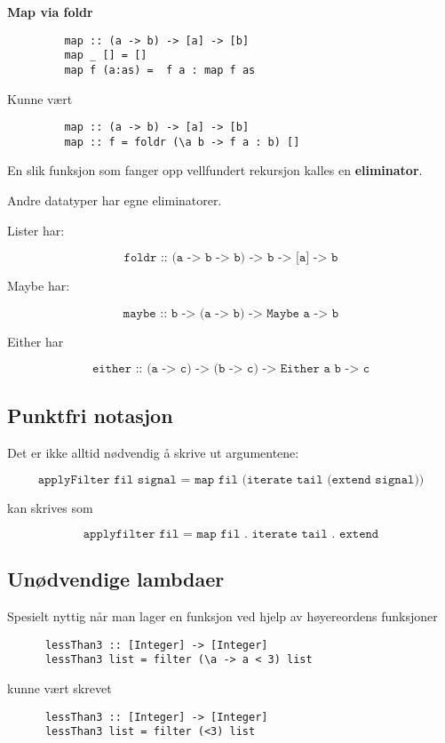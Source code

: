 \documentclass{article}
\begin{document}
     \begin{eg}
         \textbf{Map via foldr}
         \begin{lstlisting}
         map :: (a -> b) -> [a] -> [b] 
         map _ [] = []
         map f (a:as) =  f a : map f as
         \end{lstlisting}

         Kunne vært

         \begin{lstlisting}
         map :: (a -> b) -> [a] -> [b] 
         map :: f = foldr (\a b -> f a : b) []
         \end{lstlisting}
     \end{eg}

     En slik funksjon som fanger opp vellfundert rekursjon kalles en \textbf{eliminator}.

     Andre datatyper har egne eliminatorer.

     \begin{eg}
        Lister har:

        \[ \texttt{foldr :: (a -> b -> b) -> b -> [a] -> b}\]

        Maybe har:

        \[ \texttt{maybe :: b -> (a -> b) -> Maybe a -> b}  \]

        Either har

        \[ \texttt{either :: (a -> c) -> (b -> c) -> Either a b -> c} \]
     \end{eg}

     \subsection{Punktfri notasjon}

     Det er ikke alltid nødvendig å skrive ut argumentene:

     \[ \texttt{applyFilter fil signal = map fil (iterate tail (extend signal))} \]

     kan skrives som

     \[ \texttt{applyfilter fil = map fil . iterate tail . extend} \]
     \subsection{Unødvendige lambdaer}

     Spesielt nyttig når man lager en funksjon ved hjelp av høyereordens funksjoner

     \begin{lstlisting}
      lessThan3 :: [Integer] -> [Integer]   
      lessThan3 list = filter (\a -> a < 3) list
     \end{lstlisting}

     kunne vært skrevet

     \begin{lstlisting}
      lessThan3 :: [Integer] -> [Integer]   
      lessThan3 list = filter (<3) list
     \end{lstlisting}
\end{document}
